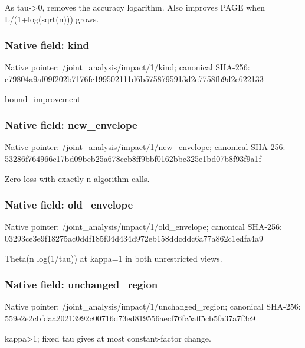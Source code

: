 \documentclass[10pt,a4paper]{article}
\begin{document}
\begingroup\raggedright\sloppy As tau->0,\allowbreak{} removes the accuracy logarithm. Also improves PAGE when L/\allowbreak{}(1+log(sqrt(n))) grows.\par\endgroup

\subsubsection{Native field: kind}
Native pointer: /joint\_\allowbreak{}analysis/impact/1/kind; canonical SHA-256: c79804a9af09f202b7176fc199502111d6b5758795913d2e7758fb9d2c622133

\begingroup\raggedright\sloppy bound\_\allowbreak{}improvement\par\endgroup

\subsubsection{Native field: new\_\allowbreak{}envelope}
Native pointer: /joint\_\allowbreak{}analysis/impact/1/new\_\allowbreak{}envelope; canonical SHA-256: 53286f764966c17bd09beb25a678ecb8ff9bbf0162bbc325e1bd07b8f93f9a1f

\begingroup\raggedright\sloppy Zero loss with exactly n algorithm calls.\par\endgroup

\subsubsection{Native field: old\_\allowbreak{}envelope}
Native pointer: /joint\_\allowbreak{}analysis/impact/1/old\_\allowbreak{}envelope; canonical SHA-256: 03293ce3e9f18275ac0ddf185f04d434d972eb158ddcddc6a77a862c1edfa4a9

\begingroup\raggedright\sloppy Theta(n log(1/\allowbreak{}tau)) at kappa=\allowbreak{}1 in both unrestricted views.\par\endgroup

\subsubsection{Native field: unchanged\_\allowbreak{}region}
Native pointer: /joint\_\allowbreak{}analysis/impact/1/unchanged\_\allowbreak{}region; canonical SHA-256: 559e2e2cbfdaa20213992c00716d73ed819556aecf76fc5aff5cb5fa37a7f3c9

\begingroup\raggedright\sloppy kappa>1;\allowbreak{} fixed tau gives at most constant-factor change.\par\endgroup
\end{document}
